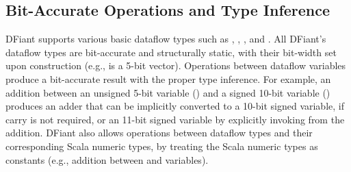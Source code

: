 \subsection{Bit-Accurate Operations and Type Inference}
DFiant supports various basic dataflow types such as , , , and .
All DFiant's dataflow types are bit-accurate and structurally static, with their bit-width set upon construction (e.g.,  is a 5-bit vector). Operations between dataflow variables produce a bit-accurate result with the proper type inference. For example, an addition between an unsigned 5-bit variable () and a signed 10-bit variable () produces an adder that can be implicitly converted to a 10-bit signed variable, if carry is not required, or an 11-bit signed variable by explicitly invoking  from the addition. DFiant also allows operations between dataflow types and their corresponding Scala numeric types, by treating the Scala numeric types as constants (e.g., addition between  and  variables). 



